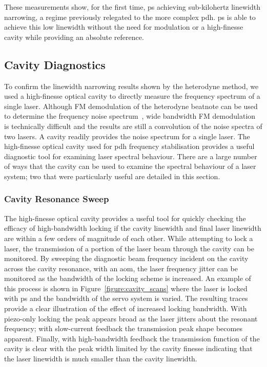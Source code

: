 These measurements show, for the first time, \gls{ps} achieving sub-kilohertz linewidth narrowing, a regime previously relegated to the more complex \gls{pdh}.
\Gls{ps} is able to achieve this low linewidth without the need for modulation or a high-finesse cavity while providing an absolute reference.

\subsection{Cavity Diagnostics}

To confirm the linewidth narrowing results shown by the heterodyne method, we used a high-finesse optical cavity to directly measure the frequency spectrum of a single laser.
Although FM demodulation of the heterodyne beatnote can be used to determine the frequency noise spectrum~\cite{turner_frequency_2002}, wide bandwidth FM demodulation is technically difficult and the results are still a convolution of the noise spectra of two lasers.
A cavity readily provides the noise spectrum for a single laser.
The high-finesse optical cavity used for \gls{pdh} frequency stabilisation provides a useful diagnostic tool for examining laser spectral behaviour.
There are a large number of ways that the cavity can be used to examine the spectral behaviour of a laser system; two that were particularly useful are detailed in this section.

\subsubsection{Cavity Resonance Sweep}

The high-finesse optical cavity provides a useful tool for quickly checking the efficacy of high-bandwidth locking if the cavity linewidth and final laser linewidth are within a few orders of magnitude of each other.
While attempting to lock a laser, the transmission of a portion of the laser beam through the cavity can be monitored.
By sweeping the diagnostic beam frequency incident on the cavity across the cavity resonance, with an \gls{aom}, the laser frequency jitter can be monitored as the bandwidth of the locking scheme is increased.
An example of this process is shown in Figure~\ref{figure:cavity_scans} where the laser is locked with \gls{ps} and the bandwidth of the servo system is varied.
The resulting traces provide a clear illustration of the effect of increased locking bandwidth.
With piezo-only locking the peak appears broad as the laser jitters about the resonant frequency; with slow-current feedback the transmission peak shape becomes apparent.
Finally, with high-bandwidth feedback the transmission function of the cavity is clear with the peak width limited by the cavity finesse indicating that the laser linewidth is much smaller than the cavity linewidth.

